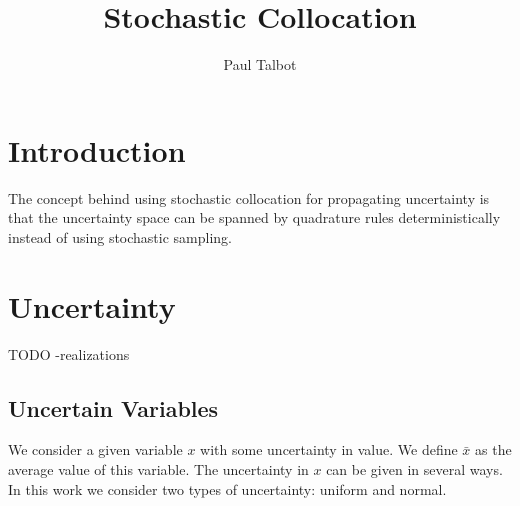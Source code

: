 \documentclass[11pt]{article} %
\title{Stochastic Collocation}
\author{Paul Talbot}
\begin{document}
\maketitle

\section{Introduction}
The concept behind using stochastic collocation for propagating uncertainty is that the uncertainty space can be spanned by quadrature rules deterministically instead of using stochastic sampling.

\section{Uncertainty}
TODO -realizations
\subsection{Uncertain Variables}
We consider a given variable $x$ with some uncertainty in value.  We define $\bar x$ as the average value of this variable.  The uncertainty in $x$ can be given in several ways.  In this work we consider two types of uncertainty: uniform and normal.
\end{document}
